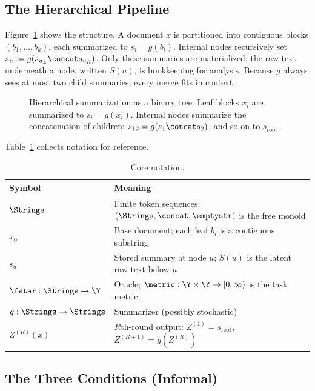 \subsection{The Hierarchical Pipeline}\label{sec:hierarchy-practice}

Figure~\ref{fig:hierarchical_summarization} shows the structure. A document $x$ is partitioned into contiguous blocks $(b_1, \ldots, b_k)$, each summarized to $s_i = g(b_i)$. Internal nodes recursively set $s_u := g(s_{u_L} \concat s_{u_R})$. Only these summaries are materialized; the raw text underneath a node, written $S(u)$, is bookkeeping for analysis. Because $g$ always sees at most two child summaries, every merge fits in context.

\begin{figure}[t]
    \centering
    
    \caption{Hierarchical summarization as a binary tree. Leaf blocks $x_i$ are summarized to $s_i = g(x_i)$. Internal nodes summarize the concatenation of children: $s_{12} = g(s_1 \concat s_2)$, and so on to $s_{\mathrm{root}}$.}
    \label{fig:hierarchical_summarization}
\end{figure}

Table~\ref{tab:notation-main} collects notation for reference.

\begin{table}[t]
\centering\small
\begin{tabular}{ll}
\toprule
Symbol & Meaning \\
\midrule
$\Strings$ & Finite token sequences; $(\Strings, \concat, \emptystr)$ is the free monoid \\
$x_0$ & Base document; each leaf $b_i$ is a contiguous substring \\
$s_u$ & Stored summary at node $u$; $S(u)$ is the latent raw text below $u$ \\
$\fstar: \Strings \to \Y$ & Oracle; $\metric: \Y \times \Y \to [0,\infty)$ is the task metric \\
$g: \Strings \to \Strings$ & Summarizer (possibly stochastic) \\
$Z^{(R)}(x)$ & $R$th-round output: $Z^{(1)} = s_{\text{root}}$, $Z^{(R+1)} = g(Z^{(R)})$ \\
\bottomrule
\end{tabular}
\caption{Core notation.}
\label{tab:notation-main}
\end{table}

\subsection{The Three Conditions (Informal)}\label{sec:conditions-preview}

